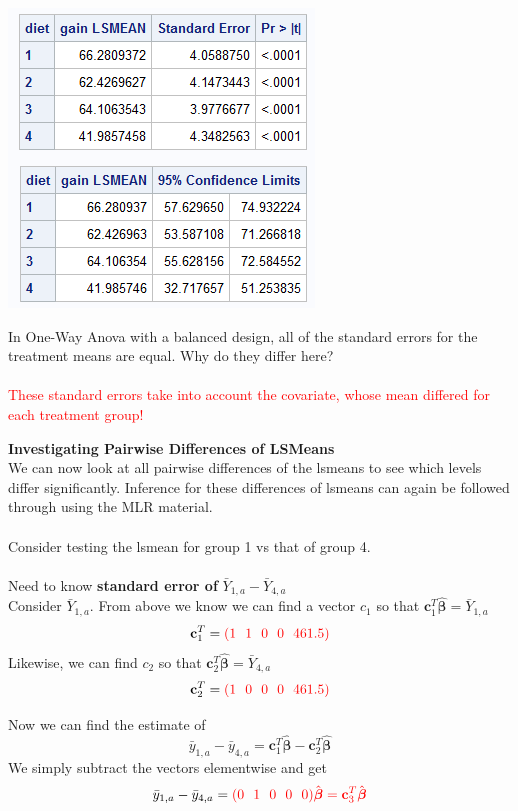 \begin{flushleft}
\includegraphics[scale=0.75]{DietsLSMeans}
\end{flushleft}

In One-Way Anova with a balanced design, all of the standard errors for the treatment means are equal.  Why do they differ here?
\textcolor{red}{\\~\\ 
These standard errors take into account the covariate, whose mean differed for each treatment group!}

\newpage

\Large\textbf{Investigating Pairwise Differences of LSMeans}\large\\
We can now look at all pairwise differences of the lsmeans to see which levels differ significantly.  Inference for these differences of lsmeans can again be followed through using the MLR material.\\~\\

Consider testing the lsmean for group 1 vs that of group 4. \\~\\
Need to know \textbf{standard error of }$\bar{Y}_{1,a}-\bar{Y}_{4,a}$\\

Consider $\bar{Y}_{1,a}$.  From above we know we can find a vector $c_1$ so that $\textbf{c}^{T}_1\hat{\boldsymbol{\beta}} = \bar{Y}_{1,a}$ 
$$\textbf{c}_1^{T}=\textcolor{red}{(1~~1~~0~~0~~461.5)}$$
Likewise, we can find $c_2$ so that $\textbf{c}^{T}_2\hat{\boldsymbol{\beta}} = \bar{Y}_{4,a}$ 
$$\textbf{c}_2^{T}=\textcolor{red}{(1~~0~~0~~0~~461.5)}$$

Now we can find the estimate of 
$$\bar{y}_{1,a}-\bar{y}_{4,a} = \textbf{c}^{T}_1\hat{\boldsymbol{\beta}}-\textbf{c}^{T}_2\hat{\boldsymbol{\beta}}$$
We simply subtract the vectors elementwise and get
$$\bar{y}_{1,a}-\bar{y}_{4,a}= \textcolor{red}{(0~~1~~0~~0~~0)\hat{\boldsymbol{\beta}}=\textbf{c}^{T}_3 \hat{\boldsymbol{\beta}}}$$~\\

